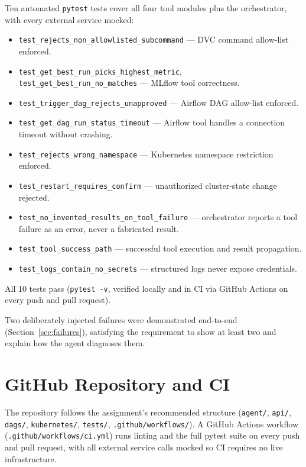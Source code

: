 \documentclass[11pt,a4paper]{article}
\begin{document}
Ten automated \texttt{pytest} tests cover all four tool modules plus the
orchestrator, with every external service mocked:

\begin{itemize}
  \item \texttt{test\_rejects\_non\_allowlisted\_subcommand} --- DVC command allow-list enforced.
  \item \texttt{test\_get\_best\_run\_picks\_highest\_metric}, \texttt{test\_get\_best\_run\_no\_matches} --- MLflow tool correctness.
  \item \texttt{test\_trigger\_dag\_rejects\_unapproved} --- Airflow DAG allow-list enforced.
  \item \texttt{test\_get\_dag\_run\_status\_timeout} --- Airflow tool handles a connection timeout without crashing.
  \item \texttt{test\_rejects\_wrong\_namespace} --- Kubernetes namespace restriction enforced.
  \item \texttt{test\_restart\_requires\_confirm} --- unauthorized cluster-state change rejected.
  \item \texttt{test\_no\_invented\_results\_on\_tool\_failure} --- orchestrator reports a tool failure as an error, never a fabricated result.
  \item \texttt{test\_tool\_success\_path} --- successful tool execution and result propagation.
  \item \texttt{test\_logs\_contain\_no\_secrets} --- structured logs never expose credentials.
\end{itemize}

All 10 tests pass (\texttt{pytest -v}, verified locally and in CI via
GitHub Actions on every push and pull request).

Two deliberately injected failures were demonstrated end-to-end
(Section~\ref{sec:failures}), satisfying the requirement to show at least
two and explain how the agent diagnoses them.

\section{GitHub Repository and CI}

The repository follows the assignment's recommended structure
(\texttt{agent/}, \texttt{api/}, \texttt{dags/}, \texttt{kubernetes/},
\texttt{tests/}, \texttt{.github/workflows/}). A GitHub Actions workflow
(\texttt{.github/workflows/ci.yml}) runs linting and the full pytest suite
on every push and pull request, with all external service calls mocked so
CI requires no live infrastructure.
\end{document}
